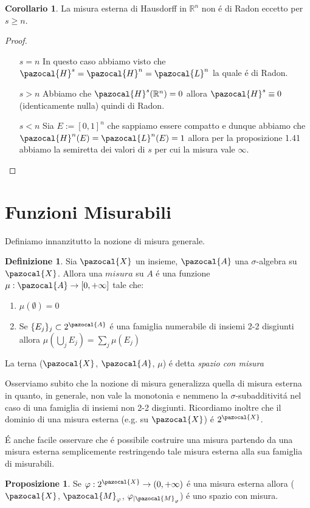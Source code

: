 \documentclass[11pt,a4paper]{report}
\theoremstyle{plain}
\theoremstyle{definition}
\newtheorem{defn}[thm]{Definizione} %
\newtheorem{prop}[thm]{Proposizione} %
\newtheorem{cor}[thm]{Corollario} %
\newcommand{\M}{\pazocal{M}_\varphi}
\newcommand{\X}{\pazocal{X}}
\newcommand{\Hu}{\pazocal{H}}
\newcommand{\Le}{\pazocal{L}}
\newcommand{\A}{\pazocal{A}}
\begin{document}
\begin{cor}
	La misura esterna di Hausdorff in $\mathbb{R}^n$ non \'e di Radon eccetto per $s \ge n$.
\end{cor}
\begin{proof}
	\begin{itemize}
		\item[$s = n$] In questo caso abbiamo visto che $\Hu^s = \Hu^n = \Le^n$ la quale \'e di Radon.
		\item[$s > n$] Abbiamo che $\Hu^s(\mathbb{R}^n) = 0$ allora $\Hu^s \equiv 0$ (identicamente nulla) quindi di Radon.
		\item[$s < n$] Sia $E := [0,1]^n$ che sappiamo essere compatto e dunque abbiamo che $\Hu^n(E) = \Le^n(E) = 1$ allora per la proposizione 1.41 abbiamo la semiretta dei valori di $s$ per cui la misura vale $\infty$.
	\end{itemize}
\end{proof}

\section{Funzioni Misurabili}

Definiamo innanzitutto la nozione di misura generale.
\begin{defn}
	Sia $\X$ un insieme, $\A$ una  $\sigma$-algebra su $\X$. Allora una $misura$ su $A$ \'e una funzione $\mu : \A \rightarrow [0,+\infty]$ tale che:
	\begin{enumerate}
		\item $\mu(\emptyset) = 0$
		\item Se $\{E_j\}_j \subset 2^\A$ \'e una famiglia numerabile di insiemi 2-2 disgiunti allora $\mu(\bigcup\limits_j E_j) = \sum\limits_j \mu(E_j)$
	\end{enumerate}
	La terna ($\X$, $\A$, $\mu$) \'e detta \textit{spazio con misura}
\end{defn}

Osserviamo subito che la nozione di misura generalizza quella di misura esterna in quanto, in generale, non vale la monotonia e nemmeno la $\sigma$-subadditivit\'a nel caso di una famiglia di insiemi non 2-2 disgiunti. Ricordiamo inoltre che il dominio di una misura esterna (e.g. su $\X$) \'e $2^\X$.

\'E anche facile osservare che \'e possibile costruire una misura partendo da una misura esterna semplicemente restringendo tale misura esterna alla sua famiglia di misurabili.

\begin{prop}
	Se $\varphi : 2^\X \rightarrow (0,+\infty)$ \'e una misura esterna allora ($\X$, $\M$, $\varphi_{|\M}$) \'e uno spazio con misura.
\end{prop}
\end{document}
